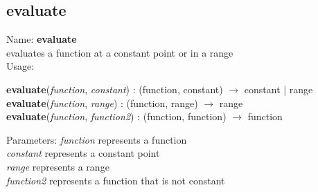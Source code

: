 \subsection{ evaluate }
\noindent Name: \textbf{evaluate}\\
evaluates a function at a constant point or in a range\\

\noindent Usage: 
\begin{center}
\textbf{evaluate}(\emph{function}, \emph{constant}) : (\textsf{function}, \textsf{constant}) $\rightarrow$ \textsf{constant} | \textsf{range}\\
\textbf{evaluate}(\emph{function}, \emph{range}) : (\textsf{function}, \textsf{range}) $\rightarrow$ \textsf{range}\\
\textbf{evaluate}(\emph{function}, \emph{function2}) : (\textsf{function}, \textsf{function}) $\rightarrow$ \textsf{function}\\
\end{center}
Parameters: 
\emph{function} represents a function\\
\emph{constant} represents a constant point\\
\emph{range} represents a range\\
\emph{function2} represents a function that is not constant\\

